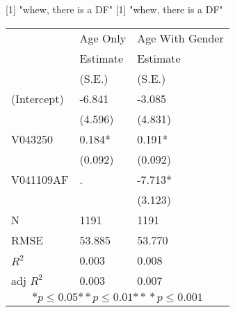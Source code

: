 [1] "whew, there is a DF"
[1] "whew, there is a DF"
\begin{tabular}{*{3}{l}}
\hline
                  & Age Only & Age With Gender   \tabularnewline
                   &Estimate   &Estimate \tabularnewline
                 &(S.E.)   &(S.E.) \tabularnewline
 \hline
 \hline
   (Intercept)     &-6.841 &-3.085 \tabularnewline
                 &(4.596)   &(4.831)  \tabularnewline
   V043250         &0.184* &0.191* \tabularnewline
                 &(0.092)   &(0.092)  \tabularnewline
   V041109AF         & .      &-7.713* \tabularnewline
                 &         &(3.123)  \tabularnewline
 \hline
 N                 &1191       &1191       \tabularnewline
 RMSE             &53.885   &53.770   \tabularnewline
 $R^2$             &0.003   &0.008   \tabularnewline
 adj $R^2$         &0.003   &0.007   \tabularnewline
 \hline
\hline
 
 \multicolumn{3}{c}{${*  p}\le 0.05$${*\!\!*  p}\le 0.01$${*\!\!*\!\!*  p}\le 0.001$}\tabularnewline
 \end{tabular}